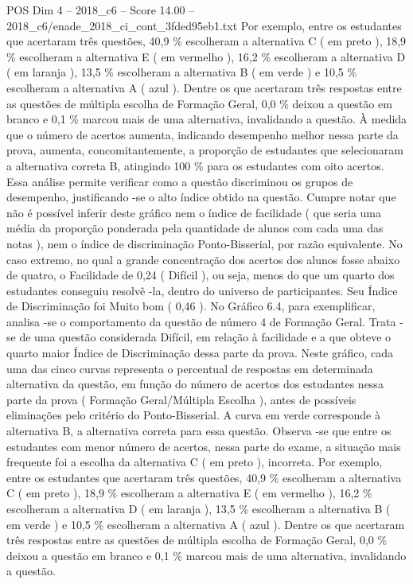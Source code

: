 \begin{textsample}{POS Dim 4 – 2018\_c6 – Score 14.00 – 2018\_c6/enade\_2018\_ci\_cont\_3fded95eb1.txt}
Por exemplo, entre os estudantes que acertaram três questões, 40,9 \% escolheram a alternativa C ( em preto ), 18,9 \% escolheram a alternativa E ( em vermelho ), 16,2 \% escolheram a alternativa D ( em laranja ), 13,5 \% escolheram a alternativa B ( em verde ) e 10,5 \% escolheram a alternativa A ( azul ).
Dentre os que acertaram três respostas entre as questões de múltipla escolha de Formação Geral, 0,0 \% deixou a questão em branco e 0,1 \% marcou mais de uma alternativa, invalidando a questão.
À medida que o número de acertos aumenta, indicando desempenho melhor nessa parte da prova, aumenta, concomitantemente, a proporção de estudantes que selecionaram a alternativa correta B, atingindo 100 \% para os estudantes com oito acertos.
Essa análise permite verificar como a questão discriminou os grupos de desempenho, justificando -se o alto índice obtido na questão.
Cumpre notar que não é possível inferir deste gráfico nem o índice de facilidade ( que seria uma média da proporção ponderada pela quantidade de alunos com cada uma das notas ), nem o índice de discriminação Ponto-Bisserial, por razão equivalente.
No caso extremo, no qual a grande concentração dos acertos dos alunos fosse abaixo de quatro, o Facilidade de 0,24 ( Difícil ), ou seja, menos do que um quarto dos estudantes conseguiu resolvê -la, dentro do universo de participantes.
Seu Índice de Discriminação foi Muito bom ( 0,46 ).
No Gráfico 6.4, para exemplificar, analisa -se o comportamento da questão de número 4 de Formação Geral.
Trata -se de uma questão considerada Difícil, em relação à facilidade e a que obteve o quarto maior Índice de Discriminação dessa parte da prova.
Neste gráfico, cada uma das cinco curvas representa o percentual de respostas em determinada alternativa da questão, em função do número de acertos dos estudantes nessa parte da prova ( Formação Geral/Múltipla Escolha ), antes de possíveis eliminações pelo critério do Ponto-Bisserial.
A curva em verde corresponde à alternativa B, a alternativa correta para essa questão.
Observa -se que entre os estudantes com menor número de acertos, nessa parte do exame, a situação mais frequente foi a escolha da alternativa C ( em preto ), incorreta.
Por exemplo, entre os estudantes que acertaram três questões, 40,9 \% escolheram a alternativa C ( em preto ), 18,9 \% escolheram a alternativa E ( em vermelho ), 16,2 \% escolheram a alternativa D ( em laranja ), 13,5 \% escolheram a alternativa B ( em verde ) e 10,5 \% escolheram a alternativa A ( azul ).
Dentre os que acertaram três respostas entre as questões de múltipla escolha de Formação Geral, 0,0 \% deixou a questão em branco e 0,1 \% marcou mais de uma alternativa, invalidando a questão.

\end{textsample}

